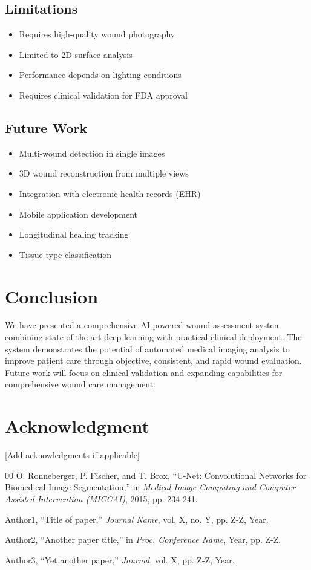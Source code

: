 \documentclass[conference]{IEEEtran}
\begin{document}
\subsection{Limitations}
\begin{itemize}
    \item Requires high-quality wound photography
    \item Limited to 2D surface analysis
    \item Performance depends on lighting conditions
    \item Requires clinical validation for FDA approval
\end{itemize}

\subsection{Future Work}
\begin{itemize}
    \item Multi-wound detection in single images
    \item 3D wound reconstruction from multiple views
    \item Integration with electronic health records (EHR)
    \item Mobile application development
    \item Longitudinal healing tracking
    \item Tissue type classification
\end{itemize}

\section{Conclusion}
We have presented a comprehensive AI-powered wound assessment system combining state-of-the-art deep learning with practical clinical deployment. The system demonstrates the potential of automated medical imaging analysis to improve patient care through objective, consistent, and rapid wound evaluation. Future work will focus on clinical validation and expanding capabilities for comprehensive wound care management.

\section*{Acknowledgment}
[Add acknowledgments if applicable]

\begin{thebibliography}{00}
 O. Ronneberger, P. Fischer, and T. Brox, ``U-Net: Convolutional Networks for Biomedical Image Segmentation,'' in \textit{Medical Image Computing and Computer-Assisted Intervention (MICCAI)}, 2015, pp. 234-241.

 Author1, ``Title of paper,'' \textit{Journal Name}, vol. X, no. Y, pp. Z-Z, Year.

 Author2, ``Another paper title,'' in \textit{Proc. Conference Name}, Year, pp. Z-Z.

 Author3, ``Yet another paper,'' \textit{Journal}, vol. X, pp. Z-Z, Year.

\end{thebibliography}
\end{document}
